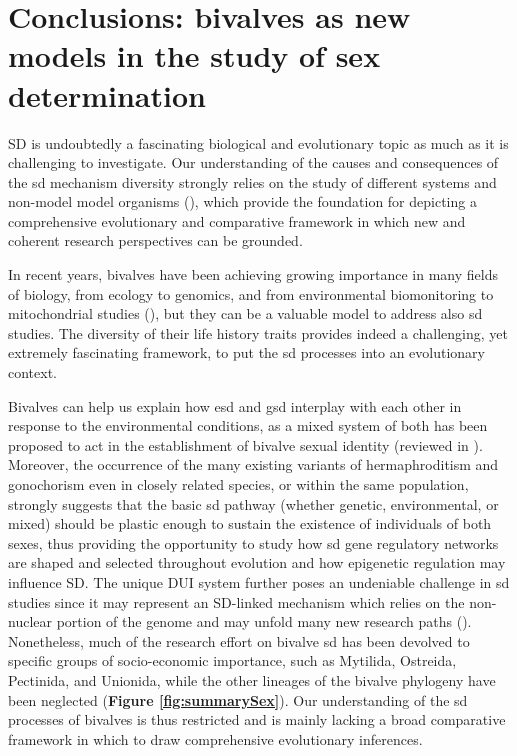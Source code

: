 \documentclass[../main.tex]{subfiles}
\begin{document}
\section{Conclusions: bivalves as new models in the study of sex determination}
SD is undoubtedly a fascinating biological and evolutionary topic as much as it is challenging to investigate. Our understanding of the causes and consequences of the \gls{sd} mechanism diversity strongly relies on the study of different systems and non-model model organisms (\textbf{\cite{bachtrog2014sex,milani2020faraway}}), which provide the foundation for depicting a comprehensive evolutionary and comparative framework in which new and coherent research perspectives can be grounded.

In recent years, bivalves have been achieving growing importance in many fields of biology, from ecology to genomics, and from environmental biomonitoring to mitochondrial studies (\textbf{\cite{milani2020faraway,ghiselli2021bivalve}}), but they can be a valuable model to address also \gls{sd} studies. The diversity of their life history traits provides indeed a challenging, yet extremely fascinating framework, to put the \gls{sd} processes into an evolutionary context.

Bivalves can help us explain how \gls{esd} and \gls{gsd} interplay with each other in response to the environmental conditions, as a mixed system of both has been proposed to act in the establishment of bivalve sexual identity (reviewed in \textbf{\cite{breton2018sex}}). Moreover, the occurrence of the many existing variants of hermaphroditism and gonochorism even in closely related species, or within the same population, strongly suggests that the basic \gls{sd} pathway (whether genetic, environmental, or mixed) should be plastic enough to sustain the existence of individuals of both sexes, thus providing the opportunity to study how \gls{sd} gene regulatory networks are shaped and selected throughout evolution and how epigenetic regulation may influence SD. The unique DUI system further poses an undeniable challenge in \gls{sd} studies since it may represent an SD-linked mechanism which relies on the non-nuclear portion of the genome and may unfold many new research paths (\textbf{\cite{milani2020faraway,ghiselli2021bivalve}}). Nonetheless, much of the research effort on bivalve \gls{sd} has been devolved to specific groups of socio-economic importance, such as Mytilida, Ostreida, Pectinida, and Unionida, while the other lineages of the bivalve phylogeny have been neglected (\textbf{Figure \ref{fig:summarySex}}). Our understanding of the \gls{sd} processes of bivalves is thus restricted and is mainly lacking a broad comparative framework in which to draw comprehensive evolutionary inferences. 
\end{document}
